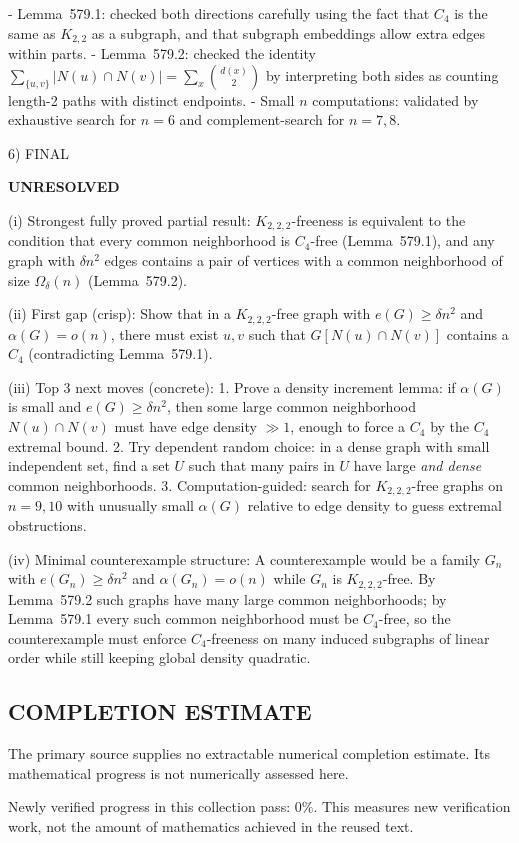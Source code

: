 - Lemma~579.1: checked both directions carefully using the fact that $C_4$ is the same as $K_{2,2}$ as a subgraph, and that subgraph embeddings allow extra edges within parts.
- Lemma~579.2: checked the identity $\sum_{\{u,v\}}|N(u)\cap N(v)|=\sum_x \binom{d(x)}{2}$ by interpreting both sides as counting length-2 paths with distinct endpoints.
- Small $n$ computations: validated by exhaustive search for $n=6$ and complement-search for $n=7,8$.

6) FINAL

\textbf{UNRESOLVED}

(i) Strongest fully proved partial result:  
$K_{2,2,2}$-freeness is equivalent to the condition that every common neighborhood is $C_4$-free (Lemma~579.1), and any graph with $\delta n^2$ edges contains a pair of vertices with a common neighborhood of size $\Omega_\delta(n)$ (Lemma~579.2).

(ii) First gap (crisp):  
Show that in a $K_{2,2,2}$-free graph with $e(G)\ge \delta n^2$ and $\alpha(G)=o(n)$, there must exist $u,v$ such that $G[N(u)\cap N(v)]$ contains a $C_4$ (contradicting Lemma~579.1).

(iii) Top 3 next moves (concrete):
1. Prove a density increment lemma: if $\alpha(G)$ is small and $e(G)\ge \delta n^2$, then some large common neighborhood $N(u)\cap N(v)$ must have edge density $\gg 1$, enough to force a $C_4$ by the $C_4$ extremal bound.
2. Try dependent random choice: in a dense graph with small independent set, find a set $U$ such that many pairs in $U$ have large \emph{and dense} common neighborhoods.
3. Computation-guided: search for $K_{2,2,2}$-free graphs on $n=9,10$ with unusually small $\alpha(G)$ relative to edge density to guess extremal obstructions.

(iv) Minimal counterexample structure:  
A counterexample would be a family $G_n$ with $e(G_n)\ge \delta n^2$ and $\alpha(G_n)=o(n)$ while $G_n$ is $K_{2,2,2}$-free.
By Lemma~579.2 such graphs have many large common neighborhoods; by Lemma~579.1 every such common neighborhood must be $C_4$-free, so the counterexample must enforce $C_4$-freeness on many induced subgraphs of linear order while still keeping global density quadratic.


\subsection*{COMPLETION ESTIMATE}
The primary source supplies no extractable numerical completion estimate. Its mathematical progress is not numerically assessed here.

Newly verified progress in this collection pass: $0\%$. This measures new verification work, not the amount of mathematics achieved in the reused text.
